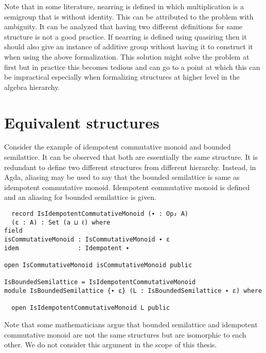 Note that in some literature, nearring is defined in which multiplication is a
semigroup that is without identity. This can be attributed to the problem with
ambiguity. It can be analyzed that having two different definitions for same
structure is not a good practice. If nearring is defined using quasiring then
it should also give an instance of additive group without having it to construct
it when using the above formalization. This solution might solve the problem at
first but in practice this becomes tedious and can go to a point at which this
can be impractical especially when formalizing structures at higher level in the
algebra hierarchy.

\section{Equivalent structures}
Consider the example of idempotent commutative monoid and bounded semilattice.
It can be observed that both are essentially the same structure. It is redundant
to define two different structures from different hierarchy. Instead, in Agda,
aliasing may be used to say that the bounded semilattice is same as idempotent
commutative monoid. Idempotent commutative monoid is defined and an aliasing for
bounded semilattice is given.
\begin{verbatim}
  record IsIdempotentCommutativeMonoid (∙ : Op₂ A)
  (ε : A) : Set (a ⊔ ℓ) where
field
isCommutativeMonoid : IsCommutativeMonoid ∙ ε
idem                : Idempotent ∙

open IsCommutativeMonoid isCommutativeMonoid public

IsBoundedSemilattice = IsIdempotentCommutativeMonoid
module IsBoundedSemilattice {∙ ε} (L : IsBoundedSemilattice ∙ ε) where

  open IsIdempotentCommutativeMonoid L public
\end{verbatim}

Note that some mathematicians argue that bounded semilattice and idempotent
commutative monoid are not the same structures but are isomorphic to each other.
We do not consider this argument in the scope of this thesis.
